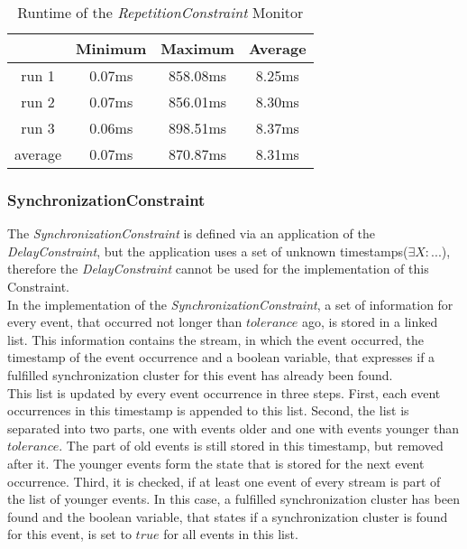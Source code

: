 	\begin{table}
		\begin{tabular}{|c|c|c|c|}
			\hline
			& Minimum & Maximum & Average \\
			\hline
			run 1	& 0.07ms & 858.08ms & 8.25ms \\
			\hline
			run 2	& 0.07ms & 856.01ms & 8.30ms\\
			\hline
			run 3	& 0.06ms & 898.51ms & 8.37ms\\
			\hline
			average & 0.07ms & 870.87ms & 8.31ms\\
			\hline
		\end{tabular}
		\centering
		\label{tab:runtimeRepetitionConstraint}
		\caption{Runtime of the \emph{RepetitionConstraint} Monitor}
	\end{table}
	
\subsubsection{SynchronizationConstraint}
	The \emph{SynchronizationConstraint} is defined via an application of the \emph{DelayConstraint}, but the application uses a set of unknown timestamps($\exists X: ...$), therefore the \emph{DelayConstraint} cannot be used for the implementation of this Constraint.\\
	In the implementation of the \emph{SynchronizationConstraint}, a set of information for every event, that occurred not longer than $tolerance$ ago,  is stored in a linked list. This information contains the stream, in which the event occurred, the timestamp of the event occurrence and a boolean variable, that expresses if a fulfilled synchronization cluster for this event has already been found.\\
	This list is updated by every event occurrence in three steps. First, each event occurrences in this timestamp is appended to this list. Second, the list is separated into two parts, one with events older and one with events younger than $tolerance$. The part of old events is still stored in this timestamp, but removed after it. The younger events form the state that is stored for the next event occurrence. Third, it is checked, if at least one event of every stream is part of the list of younger events. In this case, a fulfilled synchronization cluster has been found and the boolean variable, that states if a synchronization cluster is found for this event, is set to $true$ for all events in this list.\\
